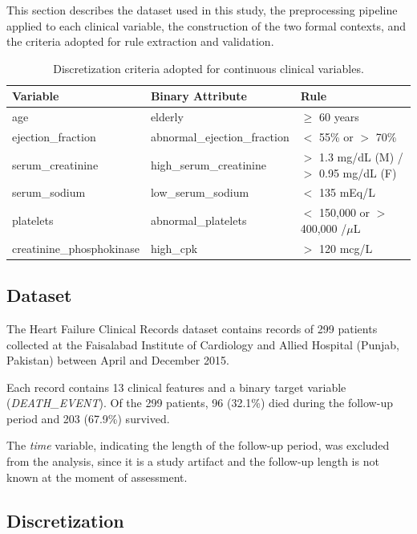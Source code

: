 \documentclass[a4paper,twoside]{article}
\begin{document}
This section describes the dataset used in this study, the preprocessing pipeline applied to each clinical variable, the construction of the two formal contexts, and the criteria adopted for rule extraction and validation.

\begin{table}[hbt]
\caption{Discretization criteria adopted for continuous clinical variables.}\label{tab:discretization}
\centering
{
\begin{tabular}{|l|l|l|}
  \hline
  \textbf{Variable} & \textbf{Binary Attribute} & \textbf{Rule} \\
  \hline
  age & elderly & $\geq$ 60 years \\
  ejection\_fraction & abnormal\_ejection\_fraction & $<$ 55\% or $>$ 70\% \\
  serum\_creatinine & high\_serum\_creatinine & $>$ 1.3 mg/dL (M) / $>$ 0.95 mg/dL (F) \\
  serum\_sodium & low\_serum\_sodium & $<$ 135 mEq/L \\
  platelets & abnormal\_platelets & $<$ 150{,}000 or $>$ 400{,}000 /$\mu$L \\
  creatinine\_phosphokinase & high\_cpk & $>$ 120 mcg/L \\
  \hline
\end{tabular}}
\end{table}

\subsection{Dataset}

The Heart Failure Clinical Records dataset \cite{Ahmad2017,ChiccoJurman2020} contains records of 299 patients collected at the Faisalabad Institute of Cardiology and Allied Hospital (Punjab, Pakistan) between April and December 2015.

Each record contains 13 clinical features and a binary target variable (\textit{DEATH\_EVENT}). Of the 299 patients, 96 (32.1\%) died during the follow-up period and 203 (67.9\%) survived. 

The \textit{time} variable, indicating the length of the follow-up period, was excluded from the analysis, since it is a study artifact and the follow-up length is not known at the moment of assessment.

\subsection{Discretization}
\end{document}
